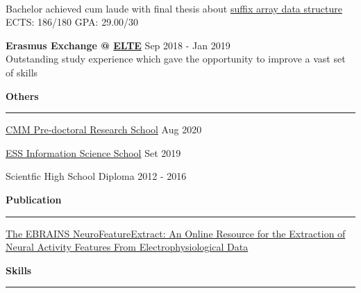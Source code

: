 \documentclass[11pt,letterpaper]{article}
\begin{document}
\begin{justify}
\begin{itemize}[label={}, leftmargin=0pt]
\begin{item}
		      \\
		      Bachelor achieved cum laude with final thesis about \href{https://dariocurr.github.io/assets/img/poster.png}{suffix array data structure}
		      \\
		      ECTS: 186/180 \hspace{0.33cm} GPA: 29.00/30
		\end{item}
		\begin{item}
		      \textbf{Erasmus Exchange @ \href{https://www.elte.hu/en/}{ELTE}}
		      \hfill
		      Sep 2018 - Jan 2019
		      \vspace{0.05cm}
		      \\
		      Outstanding study experience which gave the opportunity to improve a vast set of skills
		\end{item}
	\end{itemize}
	\setlength{\columnsep}{0.75cm}
	\begin{multicols}{2}
		\textbf{Others}\strut
		\hrule
		\begin{itemize}[label={}, itemsep=-5pt, leftmargin=0pt]
			\begin{item}
			      \href{https://cmmrs2020.mpi-sws.org/}{CMM Pre-doctoral Research School}
			      \hfill
			      Aug 2020
			\end{item}
			\begin{item}
			      \href{http://einfose.ffos.hr/summer-school/}{ESS Information Science School}
			      \hfill
			      Set 2019
			\end{item}
			\begin{item}
			      Scientfic High School Diploma
			      \hfill
			      2012 - 2016
			\end{item}
		\end{itemize}
		\vspace*{\fill}
		\columnbreak
		\textbf{Publication}\strut
		\hrule
		\begin{itemize}[label={}, leftmargin=0pt, noitemsep]
			\begin{item}
			      \href{https://www.frontiersin.org/articles/10.3389/fninf.2021.713899/full}{The EBRAINS NeuroFeatureExtract: An Online Resource for the Extraction of Neural Activity Features From Electrophysiological Data}
			\end{item}
		\end{itemize}
		\vspace*{\fill}
	\end{multicols}
	\vspace{0.1cm}
	{\large \textbf{Skills}\strut}
	\hrule

\end{justify}
\end{document}
